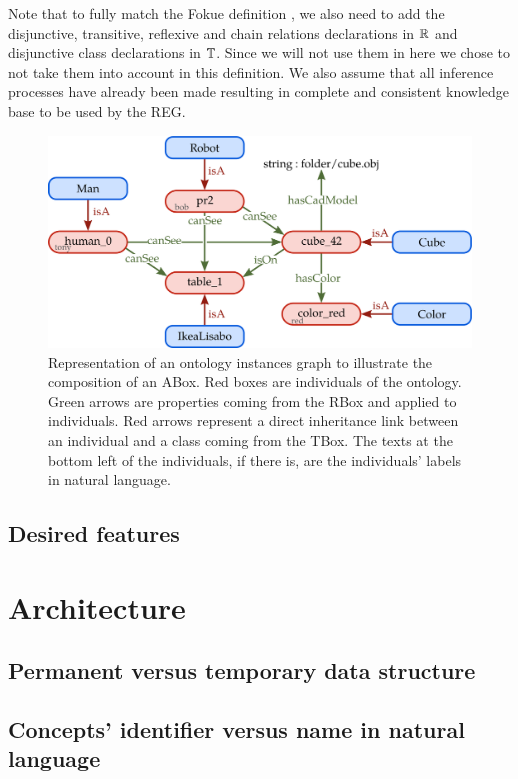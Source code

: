 Note that to fully match the Fokue definition \cite{hutchison_summary_2006}, we also need to add the disjunctive, transitive, reflexive and chain relations declarations in $\mathbb{R}$ and disjunctive class declarations in $\mathbb{T}$. Since we will not use them in here we chose to not take them into account in this definition. We also assume that all inference processes have already been made resulting in complete and consistent knowledge base to be used by the REG.

\begin{figure}[h!]
\centering
\includegraphics[scale=0.4]{figures/chapter2/Abox.png}
\caption{\label{fig:Abox}  Representation of an ontology instances graph to illustrate the composition of an ABox. Red boxes are individuals of the ontology. Green arrows are properties coming from the RBox and applied to individuals. Red arrows represent a direct inheritance link between an individual and a class coming from the TBox. The texts at the bottom left of the individuals, if there is, are the individuals' labels in natural language.}
\end{figure}

\subsection{Desired features}


\section{Architecture}

\subsection{Permanent versus temporary data structure}

\subsection{Concepts' identifier versus name in natural language}


